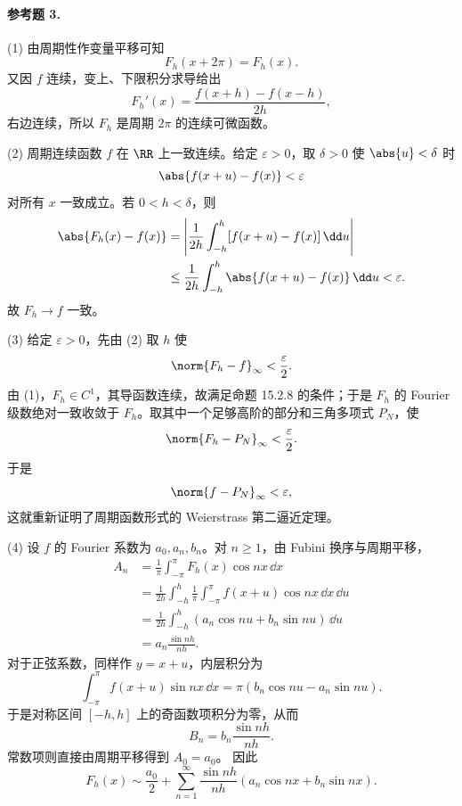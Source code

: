 \paragraph{参考题 3.}
\begin{xsolution}
(1) 由周期性作变量平移可知
\[
  F_h(x+2\pi)=F_h(x).
\]
又因 $f$ 连续，变上、下限积分求导给出
\[
  F_h'(x)=\frac{f(x+h)-f(x-h)}{2h},
\]
右边连续，所以 $F_h$ 是周期 $2\pi$ 的连续可微函数。

(2) 周期连续函数 $f$ 在 $\RR$ 上一致连续。给定 $\varepsilon>0$，取 $\delta>0$ 使
$\abs{u}<\delta$ 时
\[
  \abs{f(x+u)-f(x)}<\varepsilon
\]
对所有 $x$ 一致成立。若 $0<h<\delta$，则
\begin{align*}
  \abs{F_h(x)-f(x)}
  &=\left|\frac1{2h}\int_{-h}^{h}[f(x+u)-f(x)]\,\dd u\right|\\
  &\le\frac1{2h}\int_{-h}^{h}\abs{f(x+u)-f(x)}\,\dd u<\varepsilon.
\end{align*}
故 $F_h\to f$ 一致。

(3) 给定 $\varepsilon>0$，先由 (2) 取 $h$ 使
\[
  \norm{F_h-f}_\infty<\frac\varepsilon2.
\]
由 (1)，$F_h\in C^1$，其导函数连续，故满足命题 15.2.8 的条件；于是 $F_h$ 的 Fourier 级数绝对一致收敛于 $F_h$。取其中一个足够高阶的部分和三角多项式 $P_N$，使
\[
  \norm{F_h-P_N}_\infty<\frac\varepsilon2.
\]
于是
\[
  \norm{f-P_N}_\infty<\varepsilon,
\]
这就重新证明了周期函数形式的 Weierstrass 第二逼近定理。

(4) 设 $f$ 的 Fourier 系数为 $a_0,a_n,b_n$。对 $n\ge1$，由 Fubini 换序与周期平移，
\begin{align*}
  A_n
  &=\frac1\pi\int_{-\pi}^{\pi}F_h(x)\cos nx\,\dd x\\
  &=\frac1{2h}\int_{-h}^{h}
  \frac1\pi\int_{-\pi}^{\pi}f(x+u)\cos nx\,\dd x\,\dd u\\
  &=\frac1{2h}\int_{-h}^{h}
  (a_n\cos nu+b_n\sin nu)\,\dd u\\
  &=a_n\frac{\sin nh}{nh}.
\end{align*}
对于正弦系数，同样作 $y=x+u$，内层积分为
\[
  \int_{-\pi}^{\pi}f(x+u)\sin nx\,\dd x
  =\pi(b_n\cos nu-a_n\sin nu).
\]
于是对称区间 $[-h,h]$ 上的奇函数项积分为零，从而
\[
  B_n=b_n\frac{\sin nh}{nh}.
\]
常数项则直接由周期平移得到 $A_0=a_0$。
因此
\[
  \boxed{\displaystyle
  F_h(x)\sim\frac{a_0}{2}
  +\sum_{n=1}^{\infty}\frac{\sin nh}{nh}
  (a_n\cos nx+b_n\sin nx)}.
\]
\end{xsolution}

